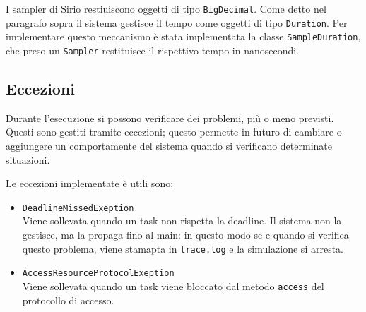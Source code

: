 \myskip

I sampler di Sirio restiuiscono oggetti di tipo \texttt{BigDecimal}. Come detto nel paragrafo sopra il sistema gestisce il tempo come oggetti di tipo \texttt{Duration}. Per implementare questo meccanismo è stata implementata la classe \texttt{SampleDuration}, che preso un \texttt{Sampler} restituisce il rispettivo tempo in nanosecondi.

\subsection{Eccezioni}
Durante l'esecuzione si possono verificare dei problemi, più o meno previsti. Questi sono gestiti tramite eccezioni; questo permette in futuro di cambiare o aggiungere un comportamente del sistema quando si verificano determinate situazioni.

\myskip

Le eccezioni implementate è utili sono:
\begin{itemize}
    \item \texttt{DeadlineMissedExeption} \\
        Viene sollevata quando un task non rispetta la deadline. Il sistema non la gestisce, ma la propaga fino al main: in questo modo se e quando si verifica questo problema, viene stamapta in \texttt{trace.log} e la simulazione si arresta.
    \item \texttt{AccessResourceProtocolExeption} \\
        Viene sollevata quando un task viene bloccato dal metodo \texttt{access} del protocollo di accesso.
\end{itemize}
